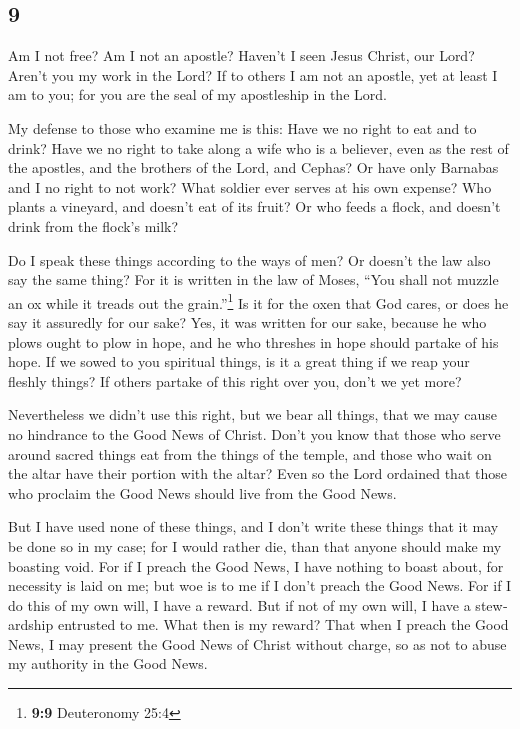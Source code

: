 \begin{paracol}{2}
\begin{otherlanguage}{english}
\hypertarget{section-17}{%
\section{9}\label{section-17}}

 Am I not free? Am I not an apostle? Haven't I seen Jesus
Christ, our Lord? Aren't you my work in the Lord?  If to
others I am not an apostle, yet at least I am to you; for you are the
seal of my apostleship in the Lord.

 My defense to those who examine me is this:
 Have we no right to eat and to drink?  Have
we no right to take along a wife who is a believer, even as the rest of
the apostles, and the brothers of the Lord, and Cephas? 
Or have only Barnabas and I no right to not work?  What
soldier ever serves at his own expense? Who plants a vineyard, and
doesn't eat of its fruit? Or who feeds a flock, and doesn't drink from
the flock's milk?

 Do I speak these things according to the ways of men? Or
doesn't the law also say the same thing?  For it is
written in the law of Moses, ``You shall not muzzle an ox while it
treads out the grain.''\footnote{\textbf{9:9} Deuteronomy 25:4} Is it
for the oxen that God cares,  or does he say it assuredly
for our sake? Yes, it was written for our sake, because he who plows
ought to plow in hope, and he who threshes in hope should partake of his
hope.  If we sowed to you spiritual things, is it a great
thing if we reap your fleshly things?  If others partake
of this right over you, don't we yet more?

Nevertheless we didn't use this right, but we bear all things, that we
may cause no hindrance to the Good News of Christ.  Don't
you know that those who serve around sacred things eat from the things
of the temple, and those who wait on the altar have their portion with
the altar?  Even so the Lord ordained that those who
proclaim the Good News should live from the Good News.

 But I have used none of these things, and I don't write
these things that it may be done so in my case; for I would rather die,
than that anyone should make my boasting void.  For if I
preach the Good News, I have nothing to boast about, for necessity is
laid on me; but woe is to me if I don't preach the Good News.
 For if I do this of my own will, I have a reward. But if
not of my own will, I have a stewardship entrusted to me.
 What then is my reward? That when I preach the Good
News, I may present the Good News of Christ without charge, so as not to
abuse my authority in the Good News.


\end{otherlanguage}
\end{paracol}
